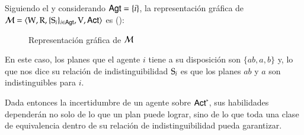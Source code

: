 \begin{ejemplo}\label{ejemplo:ults}
    Siguiendo el  y considerando $\AGT = \{i\}$, la representación gráfica 
    de $\model=\tup{\W,\R,\{\S_i\}_{i\in\AGT},\V,\ACT}$ es ():
    \begin{figure}[h]
        \hspace{2.3cm}
        \hspace{1cm}
        \caption{Representación gráfica de $\modults$}
        \label{fig:ults}
    \end{figure}

    En este caso, los planes que el agente $i$ tiene a su disposición son $\{ab,a,b\}$ y, lo que nos dice su relación de 
    indistinguibilidad $\S_i$ es que los planes $ab$ y $a$ son indistinguibles para $i$.
\end{ejemplo}

Dada entonces la incertidumbre de un agente sobre $\ACT^*$, sus habilidades dependerán no solo de lo que un plan puede lograr, sino de 
lo que toda una clase de equivalencia dentro de su relación de indistinguibilidad pueda garantizar.

